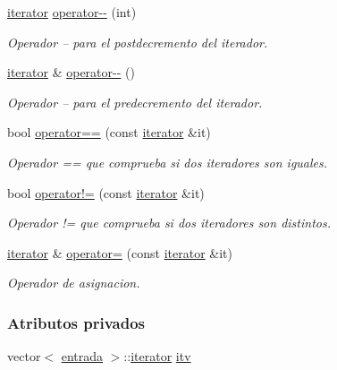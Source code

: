 \begin{DoxyCompactItemize}
\hyperlink{classconjunto_1_1iterator}{iterator} \hyperlink{classconjunto_1_1iterator_ab349bc5ba1cf1271b6e9667de998fb7b}{operator-\/-\/} (int)
\begin{DoxyCompactList}\small\item\em Operador -- para el postdecremento del iterador. \end{DoxyCompactList}\item 
\hyperlink{classconjunto_1_1iterator}{iterator} \& \hyperlink{classconjunto_1_1iterator_a9b122b264b57eca2f8432fc9a7793e63}{operator-\/-\/} ()
\begin{DoxyCompactList}\small\item\em Operador -- para el predecremento del iterador. \end{DoxyCompactList}\item 
bool \hyperlink{classconjunto_1_1iterator_af6f2f2d74883c198c3b1d89cfb14736a}{operator==} (const \hyperlink{classconjunto_1_1iterator}{iterator} \&it)
\begin{DoxyCompactList}\small\item\em Operador == que comprueba si dos iteradores son iguales. \end{DoxyCompactList}\item 
bool \hyperlink{classconjunto_1_1iterator_af95f417783c284187af6dedc5ed45a64}{operator!=} (const \hyperlink{classconjunto_1_1iterator}{iterator} \&it)
\begin{DoxyCompactList}\small\item\em Operador != que comprueba si dos iteradores son distintos. \end{DoxyCompactList}\item 
\hyperlink{classconjunto_1_1iterator}{iterator} \& \hyperlink{classconjunto_1_1iterator_aa3533ace00c8cd67ee99e40f8453a1bf}{operator=} (const \hyperlink{classconjunto_1_1iterator}{iterator} \&it)
\begin{DoxyCompactList}\small\item\em Operador de asignacion. \end{DoxyCompactList}\end{DoxyCompactItemize}
\subsubsection*{Atributos privados}
\begin{DoxyCompactItemize}
\item 
vector$<$ \hyperlink{classconjunto_a7630ace7cb17bcec07daf5804f1a0780}{entrada} $>$\-::\hyperlink{classconjunto_1_1iterator}{iterator} \hyperlink{classconjunto_1_1iterator_a670501cc6724497877d7a131efe50e60}{itv}
\end{DoxyCompactItemize}
